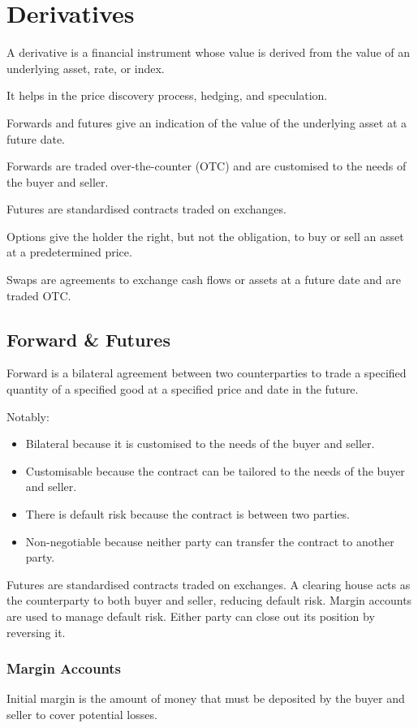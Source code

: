 \section{Derivatives}
A derivative is a financial instrument whose value is derived from the value of an underlying asset, rate, or index.

It helps in the price discovery process, hedging, and speculation.

Forwards and futures give an indication of the value of the underlying asset at a future date.

Forwards are traded over-the-counter (OTC) and are customised to the needs of the buyer and seller.

Futures are standardised contracts traded on exchanges.

Options give the holder the right, but not the obligation, to buy or sell an asset at a predetermined price.

Swaps are agreements to exchange cash flows or assets at a future date and are traded OTC.

\subsection{Forward \& Futures}

Forward is a bilateral agreement between two counterparties to trade a specified quantity of a specified good at a specified price and date in the future.

Notably:
\begin{itemize}
	\item Bilateral because it is customised to the needs of the buyer and seller.
	\item Customisable because the contract can be tailored to the needs of the buyer and seller.
	\item There is default risk because the contract is between two parties.
	\item Non-negotiable because neither party can transfer the contract to another party.
\end{itemize}

Futures are standardised contracts traded on exchanges. A clearing house acts as the counterparty to both buyer and seller, reducing default risk. Margin accounts are used to manage default risk. Either party can close out its position by reversing it.

\subsubsection{Margin Accounts}
Initial margin is the amount of money that must be deposited by the buyer and seller to cover potential losses.

